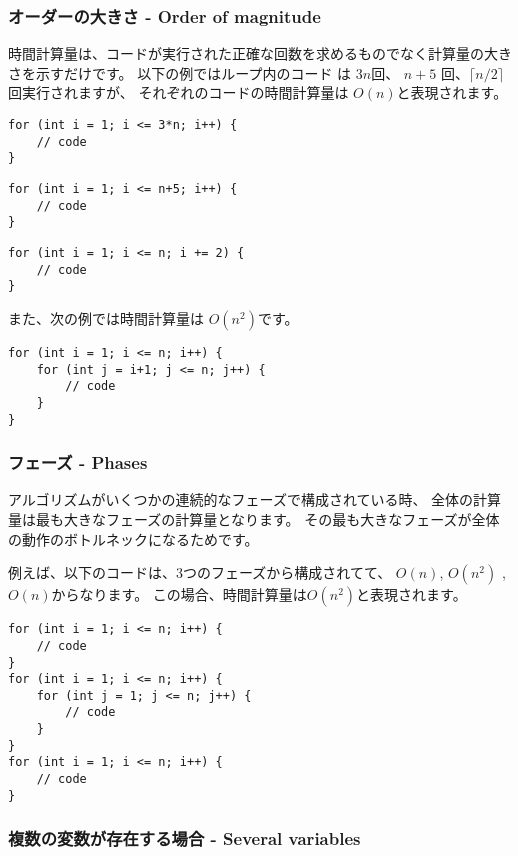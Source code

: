 \subsubsection*{オーダーの大きさ - Order of magnitude}

時間計算量は、コードが実行された正確な回数を求めるものでなく計算量の大きさを示すだけです。
以下の例ではループ内のコード は $3n$回、
$n+5$ 回、$\lceil n/2 \rceil$回実行されますが、
それぞれのコードの時間計算量は $O(n)$と表現されます。

\begin{lstlisting}
for (int i = 1; i <= 3*n; i++) {
    // code
}
\end{lstlisting}

\begin{lstlisting}
for (int i = 1; i <= n+5; i++) {
    // code
}
\end{lstlisting}

\begin{lstlisting}
for (int i = 1; i <= n; i += 2) {
    // code
}
\end{lstlisting}

また、次の例では時間計算量は $O(n^2)$です。

\begin{lstlisting}
for (int i = 1; i <= n; i++) {
    for (int j = i+1; j <= n; j++) {
        // code
    }
}
\end{lstlisting}

\subsubsection*{フェーズ - Phases}

アルゴリズムがいくつかの連続的なフェーズで構成されている時、
全体の計算量は最も大きなフェーズの計算量となります。
その最も大きなフェーズが全体の動作のボトルネックになるためです。

例えば、以下のコードは、3つのフェーズから構成されてて、
$O(n)$, $O(n^2)$ , $O(n)$からなります。
この場合、時間計算量は$O(n^2)$と表現されます。

\begin{lstlisting}
for (int i = 1; i <= n; i++) {
    // code
}
for (int i = 1; i <= n; i++) {
    for (int j = 1; j <= n; j++) {
        // code
    }
}
for (int i = 1; i <= n; i++) {
    // code
}
\end{lstlisting}

\subsubsection*{複数の変数が存在する場合 - Several variables}

